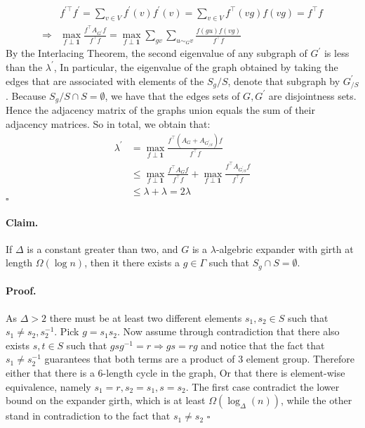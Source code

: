 \documentclass[sigplan,screen]{acmart}
\begin{document}
\begin{multicols*}{2}
  \begin{equation*}
    \begin{split}
     &  f^{\prime \top}f^{\prime}   = \sum_{v \in V}f^{\prime}\left( v \right)f^{\prime}\left( v \right)   =   \sum_{v \in V } f^{\top}\left( vg \right)f\left( vg \right) = f^{\top}f \\
     \Rightarrow  &  \max_{f \perp \mathbf{1}} { \frac{f^{\top}A_{G^{\prime}} f  }{ f^{\top}f}} =\max_{f \perp \mathbf{1}} { \sum_{gv}\sum_{ u\sim_{G} v }\frac{f\left( gu \right) f \left( vg \right)  }{ f^{\top}f}} 
    \end{split}
  \end{equation*}
  By the Interlacing Theorem, \cite{HAEMERS1995593} the second eigenvalue of any subgraph of $G^{\prime}$ is less than the $\lambda^{\prime}$, In particular, the eigenvalue of the graph obtained by taking the edges that are associated with elements of the $ S_{g} / S $, denote that subgraph by $G^{\prime}_{ / S}$. Because $S_{g} / S \cap S = \emptyset $, we have that the edges sets of $G, G^{\prime}$ are disjointness sets. Hence the adjacency matrix of the graphs union equals the sum of their adjacency matrices. So in total, we obtain that:  
    \begin{equation*}
    \begin{split}
      \lambda^{\prime} &= \max_{f \perp \mathbf{1}} { \frac{f^{\top} \left( A_{G} + A_{G^{\prime}_{/S}} \right) f  }{ f^{\top}f}} \\
      & \le  \max_{f \perp \mathbf{1}} { \frac{f^{\top}A_{G} f  }{ f^{\top}f}} +  \max_{f \perp \mathbf{1}} { \frac{f^{\top}A_{G^{\prime}_{/S}} f  }{ f^{\top}f}} \\
      & \le \lambda + \lambda = 2\lambda
    \end{split}
  \end{equation*} 
  $\square$ 
  \paragraph{Claim.} If $\Delta$ is a constant greater than two, and $G$ is a $\lambda$-algebric expander with girth at length $\Omega\left( \log n \right)$, then it there exists a $g \in \Gamma$ such that $S_{g}\cap S = \emptyset$.  
  \paragraph{Proof.} As $\Delta > 2 $ there must be at least two different elements $s_{1},s_{2} \in S$  such that $s_{1} \neq s_{2}, s_{2}^{-1}$. Pick $g = s_{1}s_{2}$. Now assume through contradiction that there also exists $s,t \in S$ such that $gsg^{-1} = r \Rightarrow gs = rg$ and notice that the fact that $s_{1}\neq s_{2}^{-1}$ guarantees that both terms are a product of $3$ element group. Therefore either that there is a $6$-length cycle in the graph, Or that there is element-wise equivalence, namely $s_{1} = r, s_{2} = s_{1}, s=s_{2}$. The first case contradict the lower bound on the expander girth, which is at least $\Omega \left( \log_{\Delta}(n) \right)$, while the other stand in contradiction to the fact that $s_{1} \neq s_{2}$ $\square$  

\end{multicols*}
\end{document}
